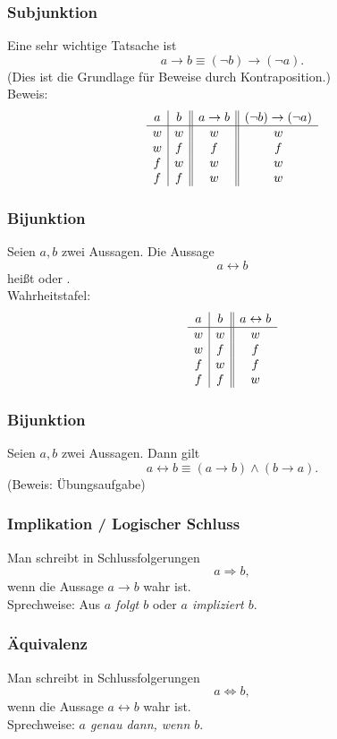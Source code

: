 %
%
\begin{frame}\frametitle{Subjunktion}
	
	Eine sehr wichtige Tatsache ist
	$$
		a \rightarrow b \equiv (\neg b) \rightarrow (\neg a).
	$$
	(Dies ist die Grundlage für Beweise durch Kontraposition.)\\[3mm]
	\pause
	Beweis:\\
	$$
		\begin{array}{c | c || c || c}
			a	& b	& a\rightarrow b	&(\neg b) \rightarrow (\neg a)	\\ \hline
			w	& w	& w				& w						\\
			w	& f	& f				& f						\\
			f	& w	& w				& w						\\
			f	& f	& w				& w						
		\end{array}
	$$
	
\end{frame}
%
%
\begin{frame}\frametitle{Bijunktion}
	
	Seien $a, b$ zwei Aussagen. Die Aussage
	$$
		a \leftrightarrow b
	$$
	heißt  oder . \\

	\vfill
	Wahrheitstafel:
	$$
		\begin{array}{c | c || c}
			a	& b	& a\leftrightarrow b	\\ \hline
			w	& w	& w		\\
			w	& f	& f		\\
			f	& w	& f		\\
			f	& f	& w	
		\end{array}
	$$
	
\end{frame}
%
%
\begin{frame}\frametitle{Bijunktion}
	
	Seien $a, b$ zwei Aussagen. Dann gilt
	$$
		a \leftrightarrow b \equiv (a\rightarrow b) \land (b\rightarrow a).
	$$
	(Beweis: Übungsaufgabe)
	
\end{frame}
%
%
\begin{frame}\frametitle{Implikation / Logischer Schluss}
	
	Man schreibt in Schlussfolgerungen
	$$
		a \Rightarrow b,
	$$
	wenn die Aussage $a\rightarrow b$ wahr ist.\\[2mm]
	
	Sprechweise: Aus {\em $a$ folgt $b$} oder {\em $a$ impliziert $b$}.
	
\end{frame}
%
%
\begin{frame}\frametitle{Äquivalenz}
	
	Man schreibt in Schlussfolgerungen
	$$
		a \Leftrightarrow b,
	$$
	wenn die Aussage $a\leftrightarrow b$ wahr ist.\\[2mm]
	
	Sprechweise: {\em $a$ genau dann, wenn $b$}.
	
\end{frame}
%
